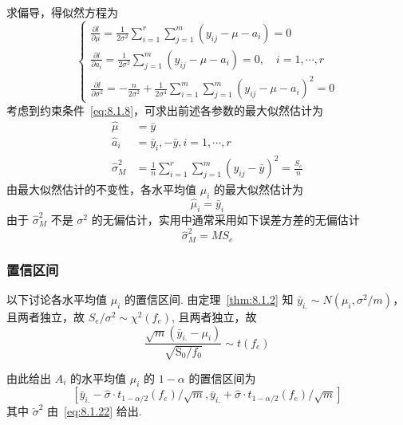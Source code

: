 求偏导，得似然方程为
\begin{equation*}
  \begin{cases}
    \frac{\partial l}{\partial \mu} =\frac{1}{2 \sigma^{2}} \sum_{i=1}^{r} \sum_{j=1}^{m}\left(y_{i j}-\mu-a_{i}\right)=0 \\
    \frac{\partial l}{\partial a_{i}} =\frac{1}{2 \sigma^{2}} \sum_{j=1}^{m}\left(y_{i j}-\mu-a_{i}\right)=0, \quad i=1, \cdots, r\\
    \frac{\partial l}{\partial \sigma^{2}} =-\frac{n}{2 \sigma^{2}}+\frac{1}{2 \sigma^{4}} \sum_{i=1}^{m} \sum_{j=1}^{m}\left(y_{i j}-\mu-a_{i}\right)^{2}=0
  \end{cases}
\end{equation*}
考虑到约束条件~\eqref{eq:8.1.8}，可求出前述各参数的最大似然估计为
\begin{equation}
  \label{eq:8.1.20}
  \begin{split}
    \hat{\mu} &= \bar{y}\\
    \hat{a}_{i} & =\bar{y}_{i},-\bar{y}, i=1, \cdots, r \\
    \hat{\sigma}_{M}^{2} &= \frac{1}{n} \sum_{i=1}^{r} \sum_{j=1}^{m}\left(y_{i j}-\bar{y}\right)^{2}=\frac{S_{e}}{n}
  \end{split}
\end{equation}
由最大似然估计的不变性，各水平均值 $\mu_i$ 的最大似然估计为
\begin{equation}
  \label{eq:8.1.21}
  \hat{\mu}_{i}=\bar{y}_{i}
\end{equation}
由于 $\hat{\sigma}_{M}^{2}$ 不是 $\sigma^2$ 的无偏估计，实用中通常采用如下误差方差的无偏估计
\begin{equation}
  \label{eq:8.1.22}
  \hat{\sigma}_{M}^{2} = M S_{e}
\end{equation}

\subsubsection{置信区间}

以下讨论各水平均值 $\mu_i$ 的置信区间. 由定理~\ref{thm:8.1.2} 知 $\bar{y}_{i.} \sim N (\mu_{i}, \sigma^{2}/m)$，且两者独立，故 $S_e/\sigma^2 \sim \chi^2(f_e)$, 且两者独立，故
\begin{equation*}
  \frac{\sqrt{m}\left(\bar{y}_{i.}-\mu_{i}\right)}{\sqrt{\mathrm{S}_{0} / f_{0}}} \sim t\left(f_{e}\right)
\end{equation*}

由此给出 $A_i$ 的水平均值 $\mu_i$ 的 $1-\alpha$ 的置信区间为
\begin{equation}\label{eq:8.1.23}
  \left[\bar{y}_{i.}-\hat{\sigma} \cdot t_{1-\alpha / 2}(f_{e}) / \sqrt{m}, \bar{y}_{i.}+\hat{\sigma} \cdot t_{1-\alpha / 2}(f_{e}) / \sqrt{m}\right]
\end{equation}
其中 $\tilde{\sigma}^2$ 由~\eqref{eq:8.1.22} 给出.


